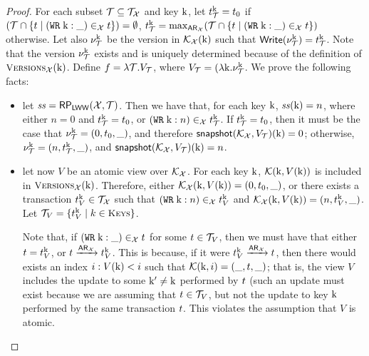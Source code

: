 \begin{proof}
For each subset $\mathcal{T} \subseteq \mathcal{T}_{\mathcal{X}}$ and key $\mathrm{k}$, let 
$t_{\mathcal{T}}^{\mathrm{k}} = t_0$ if 
$(\mathcal{T} \cap \{t \mid ({{\tt WR}}\; \mathrm{k}: \_) \in_{\mathcal{X}} t\}) = \emptyset$, 
$t_{\mathcal{T}}^{\mathrm{k}} = \max_{{\sf{AR}}_{\mathcal{X}}}(\mathcal{T} \cap \{t \mid ({{\tt WR}}\; \mathrm{k}: \_) \in_{\mathcal{X}} t\})$ otherwise.
Let also $\nu_{\mathcal{T}}^{\mathrm{k}}$ be the 
 version in $\mathcal{K}_{\mathcal{X}}(\mathrm{k})$ such that $\mathsf{Write}(\nu_{\mathcal{T}}^{\mathrm{k}}) = t_{\mathcal{T}}^{\mathrm{k}}$. 
Note that the version $\nu_{\mathcal{T}}^{\mathrm{k}}$ exists and is uniquely determined because of the 
definition of $\Versions_{\aexec}(\key{k})$.
Define $f = \lambda \mathcal{T}. V_{\mathcal{T}}$, where $V_{\mathcal{T}} = (\lambda \mathrm{k}. \nu_{\mathcal{T}}^{\mathrm{k}}$. 
We prove the following facts: 
\begin{itemize}
\item let $\mathit{ss} = \mathsf{RP}_{\mathsf{LWW}}(\mathcal{X}, \mathcal{T})$. Then we have that, for each key $\mathrm{k}$, 
$\mathit{ss}(\mathrm{k}) = n$, where either $n = 0$ and $t_{\mathcal{T}}^{\mathrm{k}} = t_0$, or 
$({{\tt WR}}\;\mathrm{k}: n) \in_{\mathcal{X}} t_{\mathcal{T}}^{\mathrm{k}}$. 
If $t_{\mathcal{T}}^{\mathrm{k}} = t_0$, then it must be the case that 
$\nu_{\mathcal{T}}^{\mathrm{k}} = (0, t_0, \_)$, and therefore $\mathsf{snapshot}(\mathcal{K}_{\mathcal{X}},V_{\mathcal{T}})(\mathrm{k}) = 0$; 
otherwise, $\nu_{\mathcal{T}}^{\mathrm{k}} = (n, t_{\mathcal{T}}^{\mathrm{k}}, \_)$, and 
$\mathsf{snapshot}(\mathcal{K}_{\mathcal{X}}, V_{\mathcal{T}})(\mathrm{k}) = n$.

\item let now $V$ be an atomic view over $\mathcal{K}_{\mathcal{X}}$. For each key $\mathrm{k}$, $\mathcal{K}(\mathrm{k}, V(\mathrm{k}))$ 
is included in $\Versions_{\aexec}(\key{k})$. Therefore, either $\mathcal{K}_{\mathcal{X}}(\mathrm{k}, V(\mathrm{k})) = 
(0, t_0, \_)$, or there exists a transaction $t_{V}^{\mathrm{k}} \in \mathcal{T}_{\mathcal{X}}$ such that 
$({{\tt WR}}\; \mathrm{k}: n) \in_{\mathcal{X}} t_{V}^{\mathrm{k}}$ and $\mathcal{K}_{\mathcal{X}}(\mathrm{k}, V(\mathrm{k})) = 
(n, t_{V}^{\mathrm{k}}, \_)$. Let $\T_{V} = \{ \tsid_{V}^{\key{k}} \mid k \in \Addr\}$. 

Note that, if $({{\tt WR}}\;\mathrm{k}: \_ ) \in_{\mathcal{X}} t$ for some $t \in \mathcal{T}_{V}$, 
then we must have that either $t = t_{V}^{\mathrm{k}}$, or $t \xrightarrow{{\sf{AR}}_{\mathcal{X}}} 
t_{V}^{\mathrm{k}}$. This is because, if it were $t_{V}^{\mathrm{k}} \xrightarrow{{\sf{AR}}_{\mathcal{X}}} 
t$, then there would exists an index $i: V(\mathrm{k}) < i$ such that  $\mathcal{K}(\mathrm{k}, i) = (\_, t, \_)$;  
that is, the view $V$ includes the update to some $\mathrm{k}' \neq \mathrm{k}$ performed by $t$ 
(such an update must exist because we are assuming that $t \in \mathcal{T}_{V}$, but not the update 
to key $\mathrm{k}$ performed by the same transaction $t$. This violates the assumption that $V$ is 
atomic. 


\end{itemize}
\end{proof}
